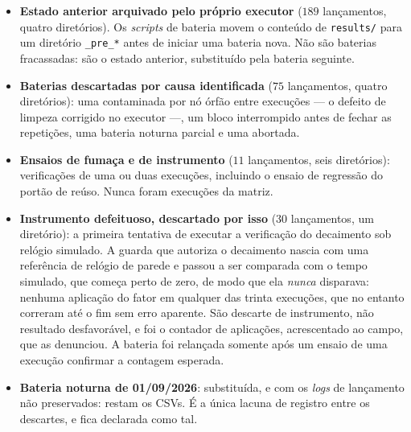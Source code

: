 \begin{enumerate}
    \begin{itemize}
        \item \textbf{Estado anterior arquivado pelo próprio executor} ($189$
        lançamentos, quatro diretórios). Os \textit{scripts} de bateria movem o
        conteúdo de \texttt{results/} para um diretório \texttt{\_pre\_*} antes de
        iniciar uma bateria nova. Não são baterias fracassadas: são o estado anterior,
        substituído pela bateria seguinte.
        \item \textbf{Baterias descartadas por causa identificada} ($75$ lançamentos,
        quatro diretórios): uma contaminada por nó órfão entre execuções --- o defeito
        de limpeza corrigido no executor ---, um bloco interrompido antes de fechar as
        repetições, uma bateria noturna parcial e uma abortada.
        \item \textbf{Ensaios de fumaça e de instrumento} ($11$ lançamentos, seis
        diretórios): verificações de uma ou duas execuções, incluindo o ensaio de
        regressão do portão de reúso. Nunca foram execuções da matriz.
        \item \textbf{Instrumento defeituoso, descartado por isso} ($30$ lançamentos,
        um diretório): a primeira tentativa de executar a verificação do decaimento sob
        relógio simulado. A guarda que autoriza o decaimento nascia com uma referência
        de relógio de parede e passou a ser comparada com o tempo simulado, que começa
        perto de zero, de modo que ela \emph{nunca} disparava: nenhuma aplicação do
        fator em qualquer das trinta execuções, que no entanto correram até o fim sem
        erro aparente. São descarte de instrumento, não resultado desfavorável, e foi o
        contador de aplicações, acrescentado ao campo, que as denunciou. A bateria foi
        relançada somente após um ensaio de uma execução confirmar a contagem esperada.
        \item \textbf{Bateria noturna de 01/09/2026}: substituída, e com os
        \textit{logs} de lançamento não preservados: restam os CSVs. É a única
        lacuna de registro entre os descartes, e fica declarada como tal.
    \end{itemize}


\end{enumerate}

